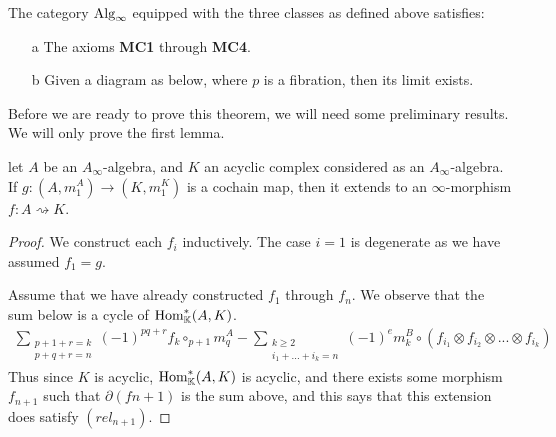 \documentclass[../thesis.tex]{subfiles}
\begin{document}
        \begin{thm}\label{thm: model-A-inf}
            The category $\tt{Alg}_\infty$ equipped with the three classes as defined above satisfies:
            \begin{itemize} 
                \item[a] The axioms \textbf{MC1} through \textbf{MC4}.
                \item[b] Given a diagram as below, where $p$ is a fibration, then its limit exists.
                \begin{center}
                \end{center}
            \end{itemize}
        \end{thm}

        Before we are ready to prove this theorem, we will need some preliminary results. We will only prove the first lemma.

        \begin{lemma}\label{lem: inf-creator}
            let $A$ be an $A_\infty$-algebra, and $K$ an acyclic complex considered as an $A_\infty$-algebra. If $g: (A,m_1^A) \rightarrow (K, m_1^K)$ is a cochain map, then it extends to an $\infty$-morphism $f: A \rightsquigarrow K$.
        \end{lemma}

        \begin{proof}
            We construct each $f_i$ inductively. The case $i=1$ is degenerate as we have assumed $f_1 = g$.

            Assume that we have already constructed $f_1$ through $f_n$. We observe that the sum below is a cycle of $\tt{Hom}^*_\mathbb{K}(A, K)$.
            \begin{align*}
                \sum_{\substack{p + 1 + r = k \\ p + q + r = n}}(-1)^{pq+r}f_k\circ_{p+1}m^A_q - \sum_{\substack{k\geq 2 \\ i_1 + ... + i_k = n}}(-1)^{e}m^B_k \circ (f_{i_1}\otimes f_{i_2}\otimes ... \otimes f_{i_k})
            \end{align*}
            Thus since $K$ is acyclic, $\tt{Hom}^*_\mathbb{K}(A, K)$ is acyclic, and there exists some morphism $f_{n+1}$ such that $\partial (f{n+1})$ is the sum above, and this says that this extension does satisfy $(rel_{n+1})$.
        \end{proof}
\end{document}
